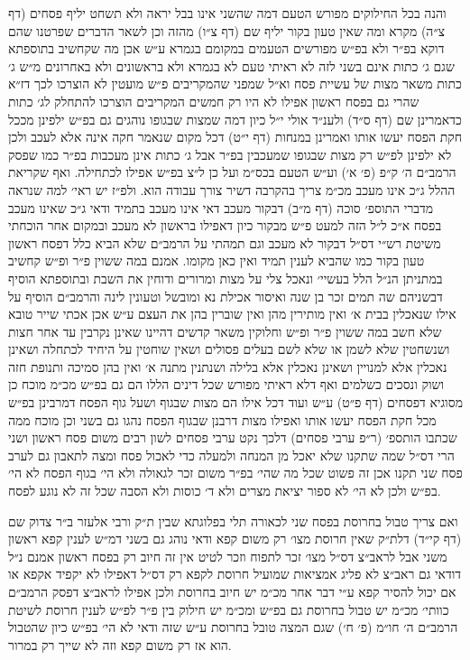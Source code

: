 \documentclass[12pt, openany]{book}
\begin{document}
\begin{multicols}{2}
והנה בכל החילוקים מפורש הטעם דמה שהשני אינו בבל יראה ולא תשחט יליף פסחים (דף צ״ה) מקרא ומה שאין טעון בקור יליף שם (דף צ״ו) מהזה וכן לשאר הדברים שפרטנו שהם דוקא בפ״ר ולא בפ״ש מפורשים הטעמים במקומם בגמרא ע״ש אכן מה שקחשיב בתוספתא שגם ג׳ כתות אינם בשני לזה לא ראיתי טעם לא בגמרא ולא בראשונים ולא באחרונים מ״ש ג׳ כתות משאר מצות של עשיית פסח וא״ל שמפני שהמקריבים פ״ש מועטין לא הוצרכו לכך דז״א שהרי גם בפסח ראשון אפילו לא היו רק חמשים המקריבים הוצרכו להתחלק לג׳ כתות כדאמרינן שם (דף ס״ד) ולענ״ד אולי י״ל כיון דמה שמצות שבגופו נוהגים גם בפ״ש ילפינן מככל חקת הפסח יעשו אותו ואמרינן במנחות (דף י״ט) דכל מקום שנאמר חקה אינה אלא לעכב ולכן לא ילפינן לפ״ש רק מצות שבגופו שמעכבין בפ״ר אבל ג׳ כתות אינן מעכבות בפ״ר כמו שפסק הרמב״ם ה׳ ק״פ (פ׳ א׳) וע״ש הטעם בכס״מ ועל כן ל״צ בפ״ש אפילו לכתחילה. ואף שקריאת ההלל ג״כ אינו מעכב מכ״מ צריך בהקרבה דשיר צורך עבודה הוא. ולפ״ז יש ראי׳ למה שנראה מדברי התוספ׳ סוכה (דף מ״ב) דבקור מעכב דאי אינו מעכב בתמיד ודאי ג״כ שאינו מעכב בפסח א״כ ל״ל הזה למעט פ״ש מבקור כיון דאפילו בראשון לא מעכב ובמקום אחר הוכחתי משיטת רש״י דס״ל דבקור לא מעכב וגם תמהתי על הרמב״ם שלא הביא כלל דפסח ראשון טעון בקור כמו שהביא לענין תמיד ואין כאן מקומו. אמנם במה ששוין פ״ר ופ״ש קחשיב במתניתן הנ״ל הלל בעשיי׳ ונאכל צלי על מצות ומרורים ודוחין את השבת ובתוספתא הוסיף דבשניהם שה תמים זכר בן שנה ואיסור אכילת נא ומובשל וטעונין לינה והרמב״ם הוסיף על אילו שנאכלין בבית א׳ ואין מותירין מהן ואין שוברין בהן את העצם ע״ש אכן אכתי שייר טובא שלא חשב במה ששוין פ״ר ופ״ש וחלוקין משאר קדשים דהיינו שאינן נקרבין עד אחר חצות ושנשחטין שלא לשמן או שלא לשם בעלים פסולים ושאין שוחטין על היחיד לכתחלה ושאינן נאכלין אלא למנויין ושאינן נאכלין אלא בלילה ושנתנין מתנה א׳ ואין בהן סמיכה ותנופת חזה ושוק ונסכים כשלמים ואף דלא ראיתי מפורש שכל דינים הללו הם גם בפ״ש מכ״מ מוכח כן מסוגיא דפסחים (דף פ״ט) ע״ש ועוד דכל אילו הם מצות שבגוף ושעל גוף הפסח דמרבינן בפ״ש מכל חקת הפסח יעשו אותו ואפילו מצות דרבנן שבגוף הפסח נהגו גם בשני וכן מוכח ממה שכתבו הותספ׳ (ר״פ ערבי פסחים) דלכך נקט ערבי פסחים לשון רבים משום פסח ראשון ושני הרי דס״ל שמה שתקנו שלא יאכל מן המנחה ולמעלה כדי לאכול פסח ומצה לתאבון גם לערב פסח שני תקנו אכן זה פשוט שכל מה שהי׳ בפ״ר משום זכר לגאולה ולא הי׳ בגוף הפסח לא הי׳ בפ״ש ולכן לא הי׳ לא ספור יציאת מצרים ולא ד׳ כוסות ולא הסבה שכל זה לא נוגע לפסח.\\\vspace{0pt}

ואם צריך טבול בחרוסת בפסח שני לכאורה תלי בפלוגתא שבין ת״ק ורבי אלעזר ב״ר צדוק שם (דף קי״ד) דלת״ק שאין חרוסת מצו׳ רק משום קפא ודאי נוהג גם בשני דמ״ש לענין קפא ראשון משני אבל לראב״צ דס״ל מצו׳ זכר לתפוח וזכר לטיט אין זה חיוב רק בפסח ראשון אמנם נ״ל דודאי גם ראב״צ לא פליג אמציאות שמועיל חרוסת לקפא רק דס״ל דאפילו לא יקפיד אקפא או אם יכול להסיר קפא ע״י דבר אחר מכ״מ יש חיוב בחרוסת ולכן אפילו לראב״צ דפסק הרמב״ם כוותי׳ מכ״מ יש טבול בחרוסת גם בפ״ש ומכ״מ יש חילוק בין פ״ר לפ״ש לענין חרוסת לשיטת הרמב״ם ה׳ חו״מ (פ׳ ח׳) שגם המצה טובל בחרוסת ע״ש שזה ודאי לא הי׳ בפ״ש כיון שהטבול הוא אז רק משום קפא וזה לא שייך רק במרור.\\\vspace{0pt}


\end{multicols}
\end{document}
